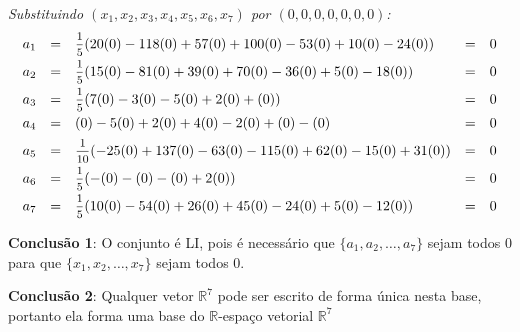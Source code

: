 \documentclass[11pt]{article}
\newenvironment{question}[1]
  {\par\addvspace{\medskipamount}
   \noindent\makebox[0pt][r]{\textbf{#1)} }\ignorespaces}
  {\par\addvspace{\medskipamount}}
\begin{document}
\begin{question}{4}
\newpage
\textit{Substituindo $(x_1,x_2,x_3,x_4,x_5,x_6,x_7)$ por $(0,0,0,0,0,0,0)$:}
$$
\begin{array}{rclcl}
    a_1 &= &\mfrac{1}{5}(20(0)-118(0)+57(0)+100(0)-53(0)+10(0)-24(0)) &= &0\\[.5em]
    a_2 &= &\mfrac{1}{5}(15(0)-81(0)+39(0)+70(0)-36(0)+5(0)-18(0)) &= &0\\[.5em]
    a_3 &= &\mfrac{1}{5}(7(0)-3(0)-5(0)+2(0)+(0)) &= &0\\[.5em]
    a_4 &= &(0)-5(0)+2(0)+4(0)-2(0)+(0)-(0) &= &0\\[.5em]
    a_5 &= &\mfrac{1}{10}(-25(0)+137(0)-63(0)-115(0)+62(0)-15(0)+31(0)) &= &0\\[.5em]
    a_6 &= &\mfrac{1}{5}(-(0)-(0)-(0)+2(0)) &= &0\\[.5em]
    a_7 &= &\mfrac{1}{5}(10(0)-54(0)+26(0)+45(0)-24(0)+5(0)-12(0)) &= &0
\end{array}
$$

\textbf{Conclusão 1}: O conjunto é LI, pois é necessário que $\{a_1,a_2, \ldots ,a_7\}$ sejam todos 0 para que $\{x_1,x_2, \ldots ,x_7\}$ sejam todos 0.

\textbf{Conclusão 2}: Qualquer vetor $\mathbb{R}^7$ pode ser escrito de forma única nesta base, portanto ela forma uma base do $\mathbb{R}$-espaço vetorial $\mathbb{R}^7$


\end{question}
\end{document}
